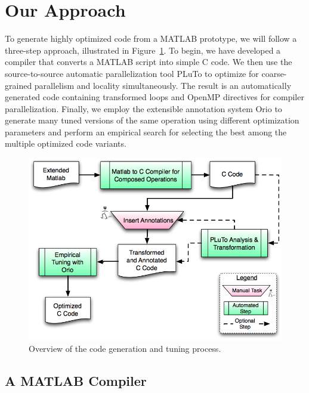 \documentclass[11pt]{article}
\begin{document}



\section{Our Approach}
\label{sec:approach}

To generate highly optimized code from a MATLAB prototype, we will follow a three-step approach, illustrated in Figure~\ref{fig:process}.    To begin, we have developed a compiler that converts a MATLAB script into simple C code.   We then use the source-to-source automatic parallelization tool  PLuTo\cite{Pluto} to optimize for coarse-grained parallelism and locality simultaneously. The result is an automatically generated code containing transformed loops and OpenMP directives for compiler parallelization.  Finally, we employ the extensible annotation system Orio to generate many tuned versions of the same operation using different optimization parameters and perform an empirical search for selecting the best among the multiple optimized code variants.



\begin{figure}[htbp]
\centering
\includegraphics[width=.7\textwidth]{figures/process.png}

\caption{Overview of the code generation and tuning process.}
\label{fig:process}
\end{figure}

\subsection{A MATLAB Compiler}
\label{sec:matlab}
\end{document}
